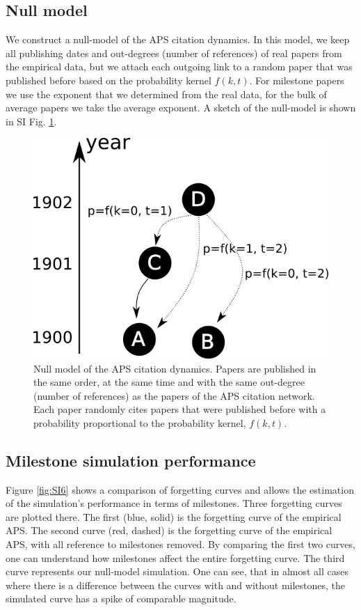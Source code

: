 \documentclass[draft,final]{vutinfth} %
\begin{document}
\subsection{Null model}
\label{SI5}

We construct a null-model of the APS citation dynamics. In this model, we keep all publishing dates and out-degrees (number of references) of real papers from the empirical data, but we attach each outgoing link to a random paper that was published before based on the probability kernel $f(k,t)$. For milestone papers we use the exponent that we determined from the real data, for the bulk of average papers we take the average exponent. A sketch of the null-model is shown in  SI Fig. \ref{fig:null}.

\begin{figure}[!ht]
	\centering
	 \includegraphics[width=0.6\columnwidth]{figures_aps/null.png}
	\caption{Null model of the APS citation dynamics. Papers are published in the same order, at the same time and with the same out-degree (number of references) as the papers of the APS citation network. Each paper randomly cites papers that were published before with a probability proportional to the probability kernel, $f(k,t)$.
	}
	\label{fig:null}
\end{figure}


\subsection{Milestone simulation performance}
\label{SI6}

Figure \ref{fig:SI6} shows a comparison of forgetting curves and allows the estimation of the simulation's performance in terms of milestones. Three forgetting curves are plotted there. The first (blue, solid) is the forgetting curve of the empirical APS. The second curve (red, dashed) is the forgetting curve of the empirical APS, with all reference to milestones removed. By comparing the first two curves, one can understand how milestones affect the entire forgetting curve. The third curve represents our null-model simulation. One can see, that in almost all cases where there is a difference between the curves with and without milestones, the simulated curve has a spike of comparable magnitude.
\end{document}
